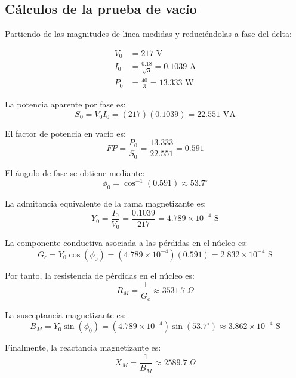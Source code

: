 \documentclass[conference]{IEEEtran}
\begin{document}
\subsection{Cálculos de la prueba de vacío}

Partiendo de las magnitudes de línea medidas y reduciéndolas a fase del delta:

\begin{align}
V_0 &= 217 \text{ V} \\
I_0 &= \frac{0.18}{\sqrt{3}} = 0.1039 \text{ A} \\
P_0 &= \frac{40}{3} = 13.333 \text{ W}
\end{align}

La potencia aparente por fase es:
\begin{equation}
S_0 = V_0 I_0 = (217)(0.1039) = 22.551 \text{ VA}
\end{equation}

El factor de potencia en vacío es:
\begin{equation}
FP = \frac{P_0}{S_0} = \frac{13.333}{22.551} = 0.591
\end{equation}

El ángulo de fase se obtiene mediante:
\begin{equation}
\phi_0 = \cos^{-1}(0.591) \approx 53.7^\circ
\end{equation}

La admitancia equivalente de la rama magnetizante es:
\begin{equation}
Y_0 = \frac{I_0}{V_0} = \frac{0.1039}{217} = 4.789 \times 10^{-4} \text{ S}
\end{equation}

La componente conductiva asociada a las pérdidas en el núcleo es:
\begin{equation}
G_c = Y_0 \cos(\phi_0) = (4.789 \times 10^{-4})(0.591) = 2.832 \times 10^{-4} \text{ S}
\end{equation}

Por tanto, la resistencia de pérdidas en el núcleo es:
\begin{equation}
R_M = \frac{1}{G_c} \approx 3531.7 \ \Omega
\end{equation}

La susceptancia magnetizante es:
\begin{equation}
B_M = Y_0 \sin(\phi_0) = (4.789 \times 10^{-4})\sin(53.7^\circ) \approx 3.862 \times 10^{-4} \text{ S}
\end{equation}

Finalmente, la reactancia magnetizante es:
\begin{equation}
X_M = \frac{1}{B_M} \approx 2589.7 \ \Omega
\end{equation}
\end{document}
